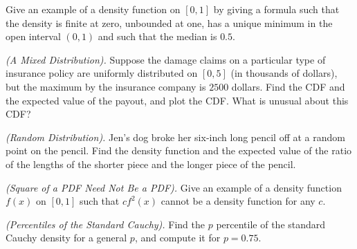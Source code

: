 \begin{problem}[Handout 12, \# 17]
  Give an example of a density function on \([0,1]\) by giving a formula
  such that the density is finite at zero, unbounded at one, has a unique
  minimum in the open interval \((0,1)\) and such that the median is
  \(0.5\).
\end{problem}
\begin{solution}

\end{solution}
\newpage

\begin{problem}[Handout 12, \# 18]
  \emph{(A Mixed Distribution).} Suppose the damage claims on a particular
  type of insurance policy are uniformly distributed on \([0,5]\) (in
  thousands of dollars), but the maximum by the insurance company is
  \(2500\) dollars. Find the CDF and the expected value of the payout, and
  plot the CDF. What is unusual about this CDF?
\end{problem}
\begin{solution}

\end{solution}
\newpage

\begin{problem}[Handout 12, \# 19]
  \emph{(Random Distribution).} Jen's dog broke her six-inch long pencil
  off at a random point on the pencil. Find the density function and the
  expected value of the ratio of the lengths of the shorter piece and the
  longer piece of the pencil.
\end{problem}
\begin{solution}

\end{solution}
\newpage

\begin{problem}[Handout 12, \# 20]
  \emph{(Square of a PDF Need Not Be a PDF).} Give an example of a density
  function \(f(x)\) on \([0,1]\) such that \(cf^2(x)\) cannot be a density
  function for any \(c\).
\end{problem}
\begin{solution}

\end{solution}
\newpage

\begin{problem}[Handout 12, \# 21]
  \emph{(Percentiles of the Standard Cauchy).} Find the \(p\)
  percentile of the standard Cauchy density for a general \(p\), and
  compute it for \(p=0.75\).
\end{problem}
\begin{solution}

\end{solution}
\newpage

